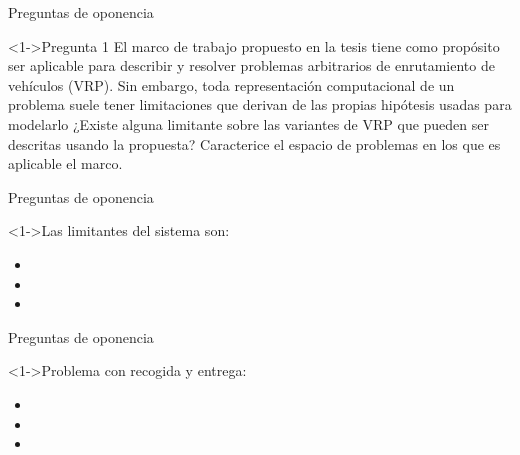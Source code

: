 

\begin{frame}{Preguntas de oponencia}
	\begin{block}<1->{Pregunta 1}
El marco de trabajo propuesto en la tesis tiene como propósito ser aplicable para describir y resolver problemas arbitrarios de enrutamiento de vehículos (VRP). Sin embargo, toda representación computacional de un problema suele tener limitaciones que derivan de las propias hipótesis usadas para modelarlo ¿Existe alguna limitante sobre las variantes de VRP que pueden ser descritas usando la propuesta? Caracterice el espacio de problemas en los que es aplicable el marco.
	\end{block}
	
\end{frame}

\begin{frame}{Preguntas de oponencia}
	\begin{block}<1->{Las limitantes del sistema son:}
	\begin{itemize}
		\item {}
		\item {}
		\item {}
	\end{itemize}
	\end{block}
	
\end{frame}

\begin{frame}{Preguntas de oponencia}
	\begin{block}<1->{Problema con recogida y entrega:}
		\begin{itemize}
			\item {}
			\item {}
			\item {}
		\end{itemize}
	\end{block}
	
\end{frame}

